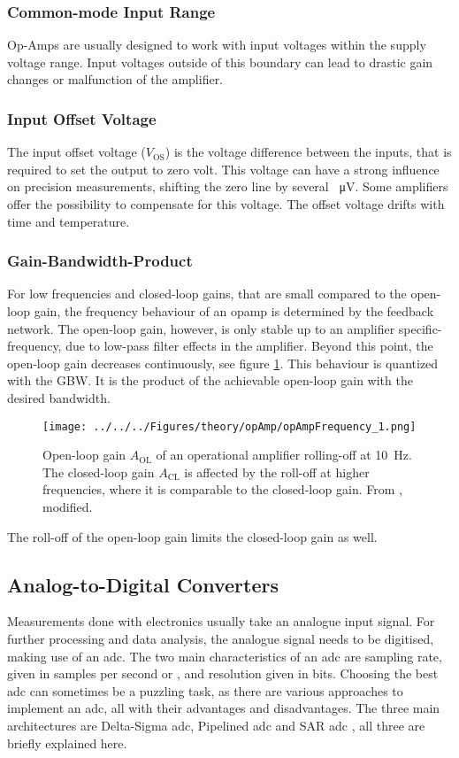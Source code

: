 \subsubsection*{Common-mode Input Range}
 Op-Amps are usually designed to work with input voltages within the supply voltage range. Input voltages outside of this boundary can lead to drastic gain changes or malfunction of the amplifier.
\subsubsection*{Input Offset Voltage}
The input offset voltage ($V_\text{OS}$) is the voltage difference between the inputs, that is required to set the output to zero volt. This voltage can have a strong influence on precision measurements, shifting the zero line by several \SI{}{\micro\volt}. Some amplifiers offer the possibility to compensate for this voltage. The offset voltage drifts with time and temperature.

\subsubsection{Gain-Bandwidth-Product}
For low frequencies and closed-loop gains, that are small compared to the open-loop gain, the frequency behaviour of an \ac{opamp} is determined by the feedback network. The open-loop gain, however, is only stable up to an amplifier specific-frequency, due to low-pass filter effects in the amplifier. Beyond this point, the open-loop gain decreases continuously, see figure \ref{fig:theory:opAmpFrequency}. This behaviour is quantized with the \ac{GBW}. It is the product of the achievable open-loop gain with the desired bandwidth.
\begin{figure}
	\centering
	\texttt{[image: ../../../Figures/theory/opAmp/opAmpFrequency\_1.png]}
	\caption{Open-loop gain $A_\text{OL}$ of an operational amplifier rolling-off at \SI{10}{\hertz}. The closed-loop gain $A_\text{CL}$ is affected by the roll-off at higher frequencies, where it is comparable to the closed-loop gain. From \cite{opamps}, modified.}
	\label{fig:theory:opAmpFrequency}
\end{figure}
The roll-off of the open-loop gain limits the closed-loop gain as well.
\subsection{Analog-to-Digital Converters}
\label{sec:theory:adc}
Measurements done with electronics usually take an analogue input signal. For further processing and data analysis, the analogue signal needs to be digitised, making use of an \acl{adc}. The two main characteristics of an \ac{adc} are sampling rate, given in samples per second or \SI{}{\sps}, and resolution given in bits. Choosing the best \ac{adc} can sometimes be a puzzling task, as there are various approaches to implement an \ac{adc}, all with their advantages and disadvantages. The three main architectures are Delta-Sigma \ac{adc}, Pipelined \ac{adc} and SAR \ac{adc} \cite{analogADC,tiADC,arrowADC}, all three are briefly explained here.
